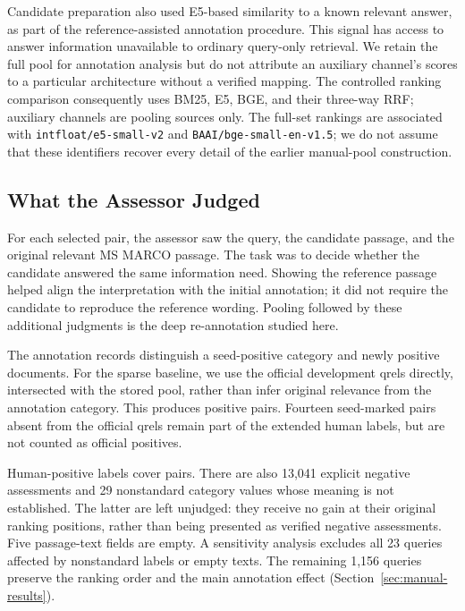 \documentclass[runningheads,a4paper]{llncs}
\begin{document}
Candidate preparation also used E5-based similarity to a known relevant answer, as part of the reference-assisted annotation procedure. This signal has access to answer information unavailable to ordinary query-only retrieval. We retain the full pool for annotation analysis but do not attribute an auxiliary channel's scores to a particular architecture without a verified mapping. The controlled ranking comparison consequently uses BM25, E5, BGE, and their three-way RRF; auxiliary channels are pooling sources only. The full-set rankings are associated with \texttt{intfloat/e5-small-v2} and \texttt{BAAI/bge-small-en-v1.5}; we do not assume that these identifiers recover every detail of the earlier manual-pool construction.

\subsection{What the Assessor Judged}
\label{sec:annotation}

For each selected pair, the assessor saw the query, the candidate passage, and the original relevant MS MARCO passage. The task was to decide whether the candidate answered the same information need. Showing the reference passage helped align the interpretation with the initial annotation; it did not require the candidate to reproduce the reference wording. Pooling followed by these additional judgments is the deep re-annotation studied here.

The annotation records distinguish a seed-positive category and newly positive documents. For the sparse baseline, we use the official development qrels directly, intersected with the stored pool, rather than infer original relevance from the annotation category. This produces \OriginalPositiveCount{} positive pairs. Fourteen seed-marked pairs absent from the official qrels remain part of the extended human labels, but are not counted as official positives.

Human-positive labels cover \HumanPositiveCount{} pairs. There are also 13,041 explicit negative assessments and 29 nonstandard category values whose meaning is not established. The latter are left unjudged: they receive no gain at their original ranking positions, rather than being presented as verified negative assessments. Five passage-text fields are empty. A sensitivity analysis excludes all 23 queries affected by nonstandard labels or empty texts. The remaining 1,156 queries preserve the ranking order and the main annotation effect (Section~\ref{sec:manual-results}).
\end{document}
